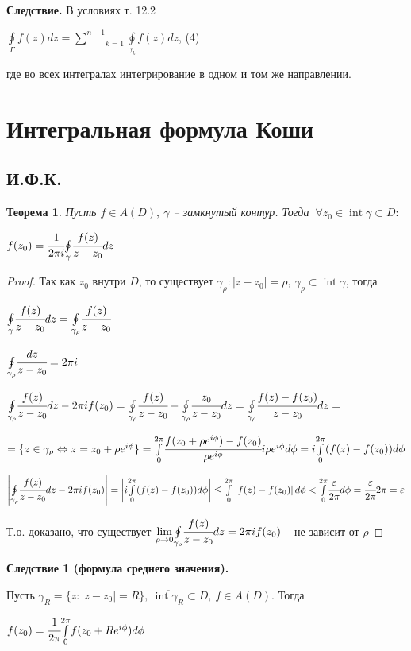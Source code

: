 \documentclass[draft]{report}
\newcommand{\mint}[2]{\underset{#1}{\overset{#2}{\int}}}
\newcommand{\moint}[1]{\underset{#1}{\oint}}
\newcommand{\msum}[2]{\underset{#1}{\overset{#2}{\sum}}}
\newcommand{\mlim}[1]{\underset{#1}{\lim}}
\newcommand{\LRA}{\Leftrightarrow}
\newcommand{\Int}{\mathop{\mathrm{int}}\nolimits}
\newcommand{\g}{\gamma}
\newcommand{\G}{\Gamma}
\renewcommand{\f}{\phi}
\newcommand{\F}{\ \forall}
\newtheorem*{theor}{Теорема}
\theoremstyle{remark}
\begin{document}
{\bfseries Следствие.}
В условиях т. 12.2

$\moint{\G}f(z)dz=\msum{k=1}{n-1}\moint{\g_k}f(z)dz$, (4)

где во всех интегралах интегрирование в одном и том же направлении.

\section{Интегральная формула Коши}

\subsection{И.Ф.К.}

\begin{theor}
Пусть $f\in A(D),\ \g$ -- замкнутый контур. Тогда $\F z_0\in\Int\g\subset D:$

$f(z_0)=\cfrac{1}{2\pi i}\moint{\g}\cfrac{f(z)}{z-z_0}dz$
\end{theor}
\begin{proof}
Так как $z_0$ внутри $D$, то существует $\g_\rho\colon|z-z_0|=\rho,\ \g_\rho\subset\Int\g$, тогда

$\moint{\g}\cfrac{f(z)}{z-z_0}dz=\moint{\g_\rho}\cfrac{f(z)}{z-z_0}$

$\moint{\g_\rho}\cfrac{dz}{z-z_0}=2\pi i$

$\moint{\g_\rho}\cfrac{f(z)}{z-z_0}dz-2\pi if(z_0)=\moint{\g_\rho}\cfrac{f(z)}{z-z_0}-\moint{\g_\rho}\cfrac{z_0}{z-z_0}dz=\moint{\g_\rho}\cfrac{f(z)-f(z_0)}{z-z_0}dz=$

$=\{z\in\g_\rho \LRA z=z_0+\rho e^{i\f}\}=\mint{0}{2\pi}\cfrac{f(z_0+\rho e^{i\f})-f(z_0)}{\rho e^{i\f}}i\rho e^{i\f}d\f=i\mint{0}{2\pi}(f(z)-f(z_0))d\f$

$\left|\moint{\g_\rho}\cfrac{f(z)}{z-z_0}dz-2\pi if(z_0)\right|=\left|i\mint{0}{2\pi}(f(z)-f(z_0))d\f\right|\leq\mint{0}{2\pi}\left|f(z)-f(z_0)\right|d\f<\mint{0}{2\pi}\cfrac{\varepsilon}{2\pi}d\f=\cfrac{\varepsilon}{2\pi}2\pi=\varepsilon$

Т.о. доказано, что существует $\mlim{\rho\to0}\moint{\g_\rho}\cfrac{f(z)}{z-z_0}dz=2\pi if(z_0)$ -- не зависит от $\rho$
\end{proof}

{\bfseries Следствие 1 (формула среднего значения).}

Пусть $\g_R=\{z\colon|z-z_0|=R\},\ \overline{\Int\g_R}\subset D,\ f\in A(D)$. Тогда 

$f(z_0)=\cfrac{1}{2\pi}\mint{0}{2\pi}f(z_0+Re^{i\f})d\f$
\end{document}
